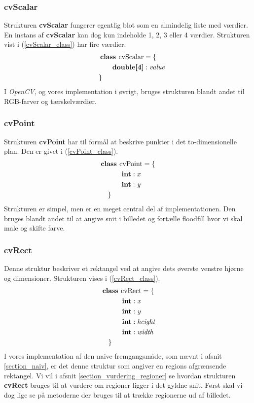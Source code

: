 {\subsubsection{cvScalar}
Strukturen \textbf{cvScalar} fungerer egentlig blot som en almindelig
liste med værdier. En instans af \textbf{cvScalar} kan dog kun indeholde
1, 2, 3 eller 4 værdier. Strukturen vist i (\ref{cvScalar_class}) har fire
værdier.
\begin{multline}
    \textbf{class~} \textrm{cvScalar} = \{ \\
    \shoveleft{\qquad\textbf{double[4]} : \textit{value}} \\
    \shoveleft{\}}\shoveright{}
    \label{cvScalar_class}
\end{multline}
I \emph{OpenCV}, og vores implementation i øvrigt, bruges strukturen
blandt andet til RGB-farver og tærskelværdier.

\subsubsection{cvPoint}
Strukturen \textbf{cvPoint} har til formål at beskrive punkter i det
to-dimensionelle plan. Den er givet i (\ref{cvPoint_class}).
\begin{multline}
    \textbf{class~} \textrm{cvPoint} = \{ \\
    \shoveleft{\qquad\textbf{int} : \textit{x}} \\
    \shoveleft{\qquad\textbf{int} : \textit{y}} \\
    \shoveleft{\}}\shoveright{}
    \label{cvPoint_class}
\end{multline}
Strukturen er simpel, men er en meget central del af implementationen.
Den bruges blandt andet til at angive snit i billedet og fortælle
floodfill hvor vi skal male og skifte farve.

\subsubsection{cvRect}
Denne struktur beskriver et rektangel ved at angive dets øverste venstre
hjørne og dimensioner. Strukturen vises i (\ref{cvRect_class}).
\begin{multline}
    \textbf{class~} \textrm{cvRect} = \{ \\
    \shoveleft{\qquad\textbf{int} : \textit{x}} \\
    \shoveleft{\qquad\textbf{int} : \textit{y}} \\
    \shoveleft{\qquad\textbf{int} : \textit{height}} \\
    \shoveleft{\qquad\textbf{int} : \textit{width}} \\
    \shoveleft{\}}\shoveright{}
    \label{cvRect_class}
\end{multline}
I vores implementation af den naive fremgangsmåde, som nævnt i afsnit
\ref{section_naiv}, er det denne struktur som angiver en regions
afgrænsende rektangel. Vi vil i afsnit \ref{section_vurdering_regioner}
se hvordan strukturen \textbf{cvRect} bruges til at vurdere om regioner
ligger i det gyldne snit. Først skal vi dog lige se på metoderne der
bruges til at trække regionerne ud af billedet.

}
